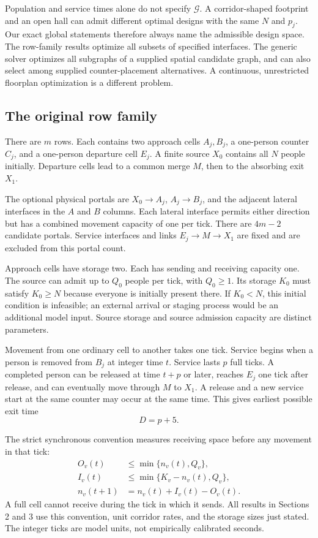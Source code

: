 \documentclass[11pt]{article}
\begin{document}
Population and service times alone do not specify $\mathcal G$. A corridor-shaped footprint and an open hall can admit different optimal designs with the same $N$ and $p_j$. Our exact global statements therefore always name the admissible design space. The row-family results optimize all subsets of specified interfaces. The generic solver optimizes all subgraphs of a supplied spatial candidate graph, and can also select among supplied counter-placement alternatives. A continuous, unrestricted floorplan optimization is a different problem.

\subsection{The original row family}
There are $m$ rows. Each contains two approach cells $A_j,B_j$, a one-person counter $C_j$, and a one-person departure cell $E_j$. A finite source $X_0$ contains all $N$ people initially. Departure cells lead to a common merge $M$, then to the absorbing exit $X_1$.

The optional physical portals are $X_0\to A_j$, $A_j\to B_j$, and the adjacent lateral interfaces in the $A$ and $B$ columns. Each lateral interface permits either direction but has a combined movement capacity of one per tick. There are $4m-2$ candidate portals. Service interfaces and links $E_j\to M\to X_1$ are fixed and are excluded from this portal count.

Approach cells have storage two. Each has sending and receiving capacity one. The source can admit up to $Q_0$ people per tick, with $Q_0\ge1$. Its storage $K_0$ must satisfy $K_0\ge N$ because everyone is initially present there. If $K_0<N$, this initial condition is infeasible; an external arrival or staging process would be an additional model input. Source storage and source admission capacity are distinct parameters.

Movement from one ordinary cell to another takes one tick. Service begins when a person is removed from $B_j$ at integer time $t$. Service lasts $p$ full ticks. A completed person can be released at time $t+p$ or later, reaches $E_j$ one tick after release, and can eventually move through $M$ to $X_1$. A release and a new service start at the same counter may occur at the same time. This gives earliest possible exit time
\[
 D=p+5.
\]

The strict synchronous convention measures receiving space before any movement in that tick:
\begin{align}
 O_v(t)&\le \min\{n_v(t),Q_v\},\\
 I_v(t)&\le \min\{K_v-n_v(t),Q_v\},\\
 n_v(t+1)&=n_v(t)+I_v(t)-O_v(t).
\end{align}
A full cell cannot receive during the tick in which it sends. All results in Sections 2 and 3 use this convention, unit corridor rates, and the storage sizes just stated. The integer ticks are model units, not empirically calibrated seconds.
\end{document}
